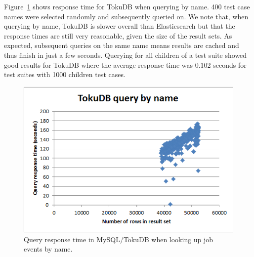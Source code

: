 Figure~\ref{fig:toku_by_name} shows response time for TokuDB when querying by name. 400 test case names were selected randomly and subsequently queried on. We note that, when querying by name, TokuDB is slower overall than Elasticsearch but that the response times are still very reasonable, given the size of the result sets. As expected, subsequent queries on the same name means results are cached and thus finish in just a few seconds. 
Querying for all children of a test suite showed good results for TokuDB where the average response time was 0.102 seconds for test suites with 1000 children test cases.

\begin{figure}[h!]
\centering
\includegraphics[]{figure/toku_by_name.png}
\caption{Query response time in MySQL/TokuDB when looking up job events by name.}
\label{fig:toku_by_name}
\end{figure}
%

